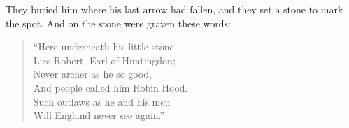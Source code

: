They buried him where his last arrow had fallen, and they set a stone to
mark the spot. And on the stone were graven these words:

\begin{quote}
``Here underneath his little stone\\
Lies Robert, Earl of Huntingdon;\\
Never archer as he so good,\\
And people called him Robin Hood.\\
Such outlaws as he and his men\\
Will England never see again.''
\end{quote}
